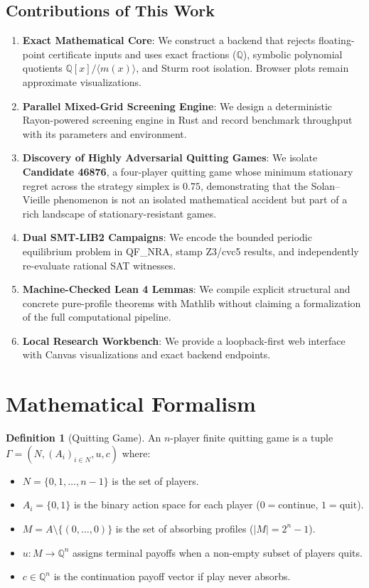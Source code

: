 \documentclass[11pt,a4paper]{article}
\theoremstyle{definition}
\newtheorem{definition}{Definition}
\begin{document}
\subsection{Contributions of This Work}
\begin{enumerate}
    \item \textbf{Exact Mathematical Core}: We construct a backend that rejects floating-point certificate inputs and uses exact fractions ($\mathbb{Q}$), symbolic polynomial quotients $\mathbb{Q}[x]/\langle m(x)\rangle$, and Sturm root isolation. Browser plots remain approximate visualizations.
    \item \textbf{Parallel Mixed-Grid Screening Engine}: We design a deterministic Rayon-powered screening engine in Rust and record benchmark throughput with its parameters and environment.
    \item \textbf{Discovery of Highly Adversarial Quitting Games}: We isolate \textbf{Candidate 46876}, a four-player quitting game whose minimum stationary regret across the strategy simplex is $0.75$, demonstrating that the Solan--Vieille phenomenon is not an isolated mathematical accident but part of a rich landscape of stationary-resistant games.
    \item \textbf{Dual SMT-LIB2 Campaigns}: We encode the bounded periodic equilibrium problem in QF\_NRA, stamp Z3/cvc5 results, and independently re-evaluate rational SAT witnesses.
    \item \textbf{Machine-Checked Lean 4 Lemmas}: We compile explicit structural and concrete pure-profile theorems with Mathlib without claiming a formalization of the full computational pipeline.
    \item \textbf{Local Research Workbench}: We provide a loopback-first web interface with Canvas visualizations and exact backend endpoints.
\end{enumerate}

\section{Mathematical Formalism}

\begin{definition}[Quitting Game]
An $n$-player finite quitting game is a tuple $\Gamma = (N, (A_i)_{i \in N}, u, c)$ where:
\begin{itemize}
    \item $N = \{0, 1, \dots, n-1\}$ is the set of players.
    \item $A_i = \{0, 1\}$ is the binary action space for each player ($0 = \text{continue}$, $1 = \text{quit}$).
    \item $M = A \setminus \{(0, \dots, 0)\}$ is the set of absorbing profiles ($|M| = 2^n - 1$).
    \item $u: M \to \mathbb{Q}^n$ assigns terminal payoffs when a non-empty subset of players quits.
    \item $c \in \mathbb{Q}^n$ is the continuation payoff vector if play never absorbs.
\end{itemize}
\end{definition}
\end{document}

